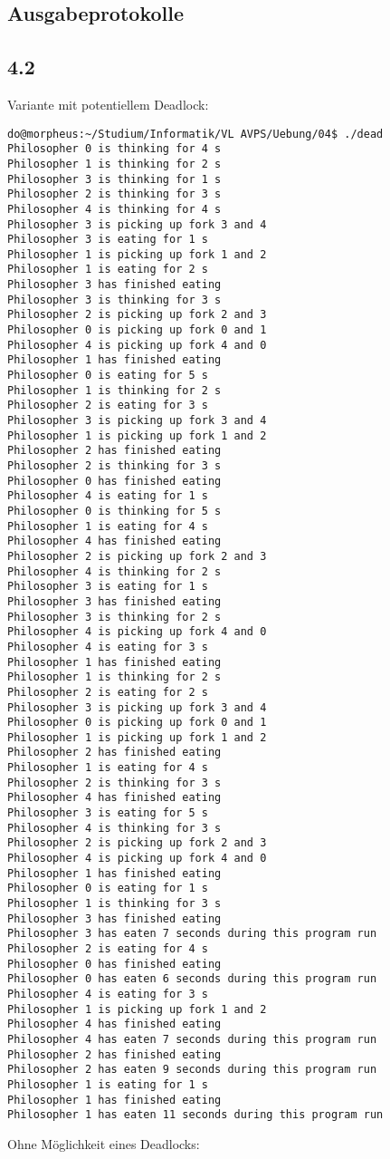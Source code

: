 \documentclass{scrartcl}
\begin{document}
\begin{appendix}
	\section{Ausgabeprotokolle}
	\subsection{4.2}
	\label{sec:results2}
	Variante mit potentiellem Deadlock:
\begin{verbatim}
do@morpheus:~/Studium/Informatik/VL AVPS/Uebung/04$ ./dead
Philosopher 0 is thinking for 4 s
Philosopher 1 is thinking for 2 s
Philosopher 3 is thinking for 1 s
Philosopher 2 is thinking for 3 s
Philosopher 4 is thinking for 4 s
Philosopher 3 is picking up fork 3 and 4
Philosopher 3 is eating for 1 s
Philosopher 1 is picking up fork 1 and 2
Philosopher 1 is eating for 2 s
Philosopher 3 has finished eating
Philosopher 3 is thinking for 3 s
Philosopher 2 is picking up fork 2 and 3
Philosopher 0 is picking up fork 0 and 1
Philosopher 4 is picking up fork 4 and 0
Philosopher 1 has finished eating
Philosopher 0 is eating for 5 s
Philosopher 1 is thinking for 2 s
Philosopher 2 is eating for 3 s
Philosopher 3 is picking up fork 3 and 4
Philosopher 1 is picking up fork 1 and 2
Philosopher 2 has finished eating
Philosopher 2 is thinking for 3 s
Philosopher 0 has finished eating
Philosopher 4 is eating for 1 s
Philosopher 0 is thinking for 5 s
Philosopher 1 is eating for 4 s
Philosopher 4 has finished eating
Philosopher 2 is picking up fork 2 and 3
Philosopher 4 is thinking for 2 s
Philosopher 3 is eating for 1 s
Philosopher 3 has finished eating
Philosopher 3 is thinking for 2 s
Philosopher 4 is picking up fork 4 and 0
Philosopher 4 is eating for 3 s
Philosopher 1 has finished eating
Philosopher 1 is thinking for 2 s
Philosopher 2 is eating for 2 s
Philosopher 3 is picking up fork 3 and 4
Philosopher 0 is picking up fork 0 and 1
Philosopher 1 is picking up fork 1 and 2
Philosopher 2 has finished eating
Philosopher 1 is eating for 4 s
Philosopher 2 is thinking for 3 s
Philosopher 4 has finished eating
Philosopher 3 is eating for 5 s
Philosopher 4 is thinking for 3 s
Philosopher 2 is picking up fork 2 and 3
Philosopher 4 is picking up fork 4 and 0
Philosopher 1 has finished eating
Philosopher 0 is eating for 1 s
Philosopher 1 is thinking for 3 s
Philosopher 3 has finished eating
Philosopher 3 has eaten 7 seconds during this program run
Philosopher 2 is eating for 4 s
Philosopher 0 has finished eating
Philosopher 0 has eaten 6 seconds during this program run
Philosopher 4 is eating for 3 s
Philosopher 1 is picking up fork 1 and 2
Philosopher 4 has finished eating
Philosopher 4 has eaten 7 seconds during this program run
Philosopher 2 has finished eating
Philosopher 2 has eaten 9 seconds during this program run
Philosopher 1 is eating for 1 s
Philosopher 1 has finished eating
Philosopher 1 has eaten 11 seconds during this program run
\end{verbatim}
Ohne Möglichkeit eines Deadlocks:


\end{appendix}
\end{document}
